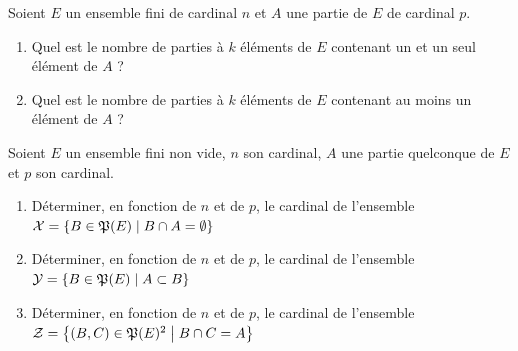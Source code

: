 \begin{exercice}
    Soient \(E\) un ensemble fini de cardinal \(n\) et \(A\) une partie de \(E\) de cardinal \(p\).
    \begin{enumerate}
        \item Quel est le nombre de parties à \(k\) éléments de \(E\) contenant un et un seul élément de \(A\) ?
        \item Quel est le nombre de parties à \(k\) éléments de \(E\) contenant au moins un  élément de \(A\) ?
    \end{enumerate}
\end{exercice}
\begin{exercice}
    Soient \(E\) un ensemble fini non vide, \(n\) son cardinal, \(A\) une partie quelconque de \(E\) et \(p\) son cardinal.
    \begin{enumerate}
        \item Déterminer, en fonction de \(n\) et de \(p\), le cardinal de l'ensemble \(\mathcal{X} = \left\{B \in \mathfrak{P}(E)\mathrel{}\middle|\mathrel{}B \cap A = \emptyset\right\}\)
        \item Déterminer, en fonction de \(n\) et de \(p\), le cardinal de l'ensemble \(\mathcal{Y} = \left\{B \in \mathfrak{P}(E)\mathrel{}\middle|\mathrel{}A \subset B\right\}\)
        \item Déterminer, en fonction de \(n\) et de \(p\), le cardinal de l'ensemble \(\mathcal{Z} = \left\{(B,C) \in \mathfrak{P}(E)^2\mathrel{}\middle|\mathrel{}B \cap C = A\right\}\)
    \end{enumerate}
\end{exercice}
